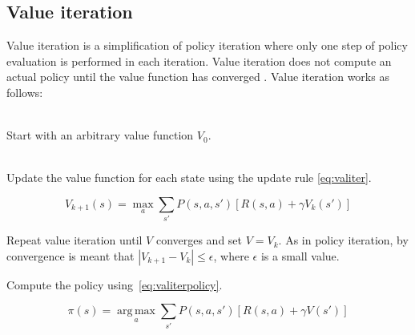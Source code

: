 \subsection{Value iteration}
\label{sec:valueiteration}

Value iteration is a simplification of policy iteration where only one step of
policy evaluation is performed in each iteration. Value iteration does not compute an actual
policy until the value function has converged \parencite{barto1998reinforcement}. Value iteration works as follows:

\begin{description}
\item[Initialization] \hfill \\
    Start with an arbitrary value function $V_0$.
\item[Value iteration] \hfill \\
    Update the value function for each state using the update rule \eqref{eq:valiter}.

\begin{equation} \label{eq:valiter}
V_{k+1}(s) = \max_a \sum_{s'}{P(s, a, s') \left[R(s, a) + \gamma V_k(s')\right]}
\end{equation}

\item Repeat value iteration until $V$ converges and set $V = V_k$. As in policy iteration, by
  convergence is meant that $|V_{k+1} - V_{k}| \leq \epsilon$, where
  $\epsilon$ is a small value. 

\item Compute the policy using~\eqref{eq:valiterpolicy}.

\begin{equation} \label{eq:valiterpolicy}
\pi(s) = \operatorname*{arg\,max}_a \sum_{s'}{P(s, a, s') \left[R(s, a) + \gamma V(s')\right]}
\end{equation}

\end{description}
